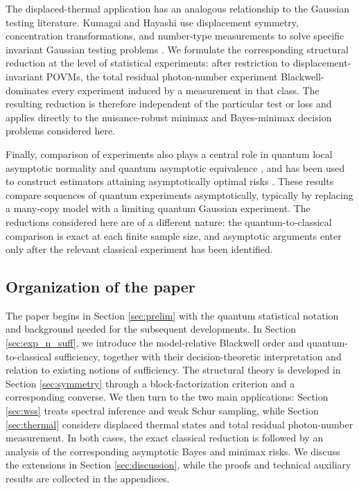 \documentclass{article}
\theoremstyle{named}
\theoremstyle{named1}
\theoremstyle{plain}
\theoremstyle{remark}
\begin{document}
The displaced-thermal application has an analogous relationship to the
Gaussian testing literature. Kumagai and Hayashi use displacement symmetry,
concentration transformations, and number-type measurements to solve
specific invariant Gaussian testing problems
\cite{KumagaiHayashi2013}. We formulate the corresponding structural
reduction at the level of statistical experiments: after restriction to
displacement-invariant POVMs, the total residual photon-number
experiment Blackwell-dominates every experiment induced by a measurement in
that class. The resulting reduction is therefore independent of the
particular test or loss and applies directly to the nuisance-robust minimax
and Bayes-minimax decision problems considered here.

Finally, comparison of experiments also plays a central role in quantum
local asymptotic normality and quantum asymptotic equivalence
\cite{GutaJencova2007,Kahn&Guta,YFG13,Fujiwara2020}, and has been used
to construct estimators attaining asymptotically optimal risks
\cite{Fujiwara2023,lowLAN,minimaxpure}. These results compare sequences
of quantum experiments asymptotically, typically by replacing a many-copy
model with a limiting quantum Gaussian experiment. The reductions considered
here are of a different nature: the quantum-to-classical comparison is exact
at each finite sample size, and asymptotic arguments enter only after the
relevant classical experiment has been identified.

\subsection*{Organization of the paper}

The paper begins in Section \ref{sec:prelim} with the quantum statistical notation and background needed for the subsequent developments. In Section \ref{sec:exp_n_suff}, we introduce the model-relative Blackwell order and quantum-to-classical sufficiency, together with their decision-theoretic interpretation and relation to existing notions of sufficiency. The structural theory is developed in Section \ref{sec:symmetry} through a block-factorization criterion and a corresponding converse. We then turn to the two main applications: Section \ref{sec:wss} treats spectral inference and weak Schur sampling, while Section \ref{sec:thermal} considers displaced thermal states and total residual photon-number measurement. In both cases, the exact classical reduction is followed by an analysis of the corresponding asymptotic Bayes and minimax risks. We discuss the extensions in Section \ref{sec:discussion}, while the proofs and technical auxiliary results are collected in the appendices.
\end{document}
